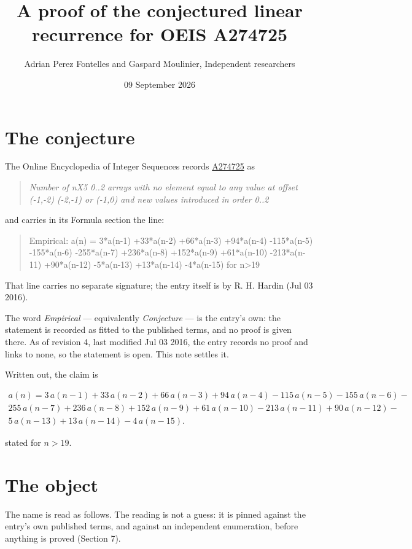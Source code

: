 \documentclass[11pt]{article}
\title{A proof of the conjectured linear recurrence for OEIS A274725}
\author{Adrian Perez Fontelles and Gaspard Moulinier, Independent researchers}
\date{09 September 2026}
\theoremstyle{definition}
\begin{document}
\maketitle
\section{The conjecture}

The Online Encyclopedia of Integer Sequences records \href{https://oeis.org/A274725}{A274725} as

\begin{quote}\itshape Number of nX5 0..2 arrays with no element equal to any value at offset (-1,-2) (-2,-1) or (-1,0) and new values introduced in order 0..2\end{quote}

and carries in its Formula section the line:

\begin{quote}\ttfamily Empirical: a(n) = 3*a(n-1) +33*a(n-2) +66*a(n-3) +94*a(n-4) -115*a(n-5) -155*a(n-6) -255*a(n-7) +236*a(n-8) +152*a(n-9) +61*a(n-10) -213*a(n-11) +90*a(n-12) -5*a(n-13) +13*a(n-14) -4*a(n-15) for n>19\end{quote}

That line carries no separate signature; the entry itself is by R. H. Hardin (Jul 03 2016).

The word {\itshape Empirical} --- equivalently {\itshape Conjecture} --- is the entry's own: the statement is recorded as fitted to the published terms, and no proof is given there. As of revision 4, last modified Jul 03 2016, the entry records no proof and links to none, so the statement is open. This note settles it.

Written out, the claim is

\begin{multline*} a(n) = 3\,a(n-1) + 33\,a(n-2) + 66\,a(n-3) + 94\,a(n-4) - 115\,a(n-5) - 155\,a(n-6) - \\ 255\,a(n-7) + 236\,a(n-8) + 152\,a(n-9) + 61\,a(n-10) - 213\,a(n-11) + 90\,a(n-12) - \\ 5\,a(n-13) + 13\,a(n-14) - 4\,a(n-15). \end{multline*}

stated for $n > 19$.

\section{The object}

The name is read as follows. The reading is not a guess: it is pinned against the entry's own published terms, and against an independent enumeration, before anything is proved (Section 7).
\end{document}
